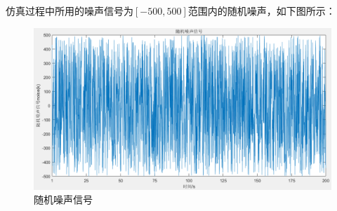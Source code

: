 \documentclass[UTF8, 12pt]{article}
\begin{document}
仿真过程中所用的噪声信号为$[-500, 500]$范围内的随机噪声，如下图所示：
\begin{figure}[H]
    \centering %
    \includegraphics[width=.8\textwidth]{figure/随机噪声信号.png} 
    \caption{随机噪声信号} %
\end{figure}
\end{document}
